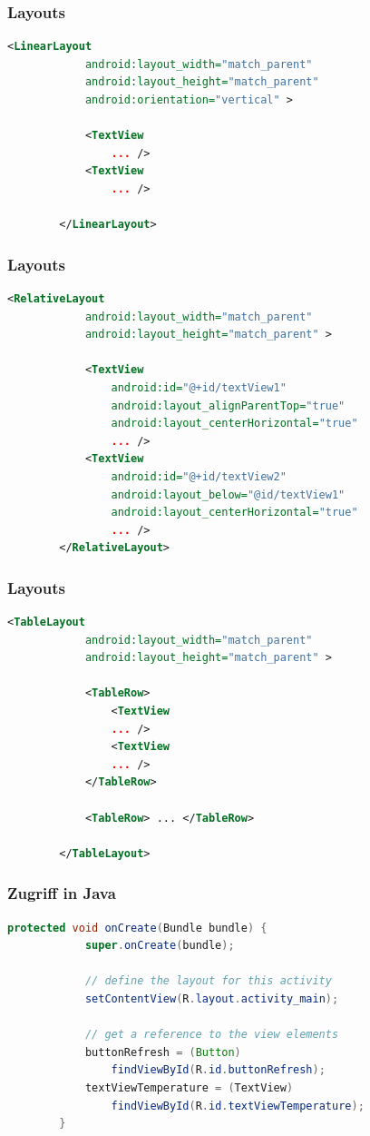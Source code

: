 \begin{frame}[fragile]
	\frametitle{Layouts}
	\vspace{-2mm}
	\begin{lstlisting}[language=XML]
		<LinearLayout
		    android:layout_width="match_parent"
		    android:layout_height="match_parent"
		    android:orientation="vertical" >

		    <TextView
		        ... />
		    <TextView
		        ... />

		</LinearLayout>
    \end{lstlisting}
\end{frame}

\begin{frame}[fragile]
	\frametitle{Layouts}
	\vspace{-2mm}
	\begin{lstlisting}[language=XML]
		<RelativeLayout
		    android:layout_width="match_parent"
		    android:layout_height="match_parent" >

		    <TextView
		        android:id="@+id/textView1"
		        android:layout_alignParentTop="true"
		        android:layout_centerHorizontal="true"
		        ... />
		    <TextView
		        android:id="@+id/textView2"
		        android:layout_below="@id/textView1"
		        android:layout_centerHorizontal="true"
		        ... />
		</RelativeLayout>
    \end{lstlisting}
\end{frame}

\begin{frame}[fragile]
	\frametitle{Layouts}
	\vspace{-2mm}
	\begin{lstlisting}[language=XML]
		<TableLayout
		    android:layout_width="match_parent"
		    android:layout_height="match_parent" >

		    <TableRow>
		        <TextView
		        ... />
		        <TextView
		        ... />
		    </TableRow>

		    <TableRow> ... </TableRow>

		</TableLayout>
    \end{lstlisting}
\end{frame}

\begin{frame}[fragile]
	\frametitle{Zugriff in Java}
	\begin{lstlisting}[language=Java]
		protected void onCreate(Bundle bundle) {
		    super.onCreate(bundle);

		    // define the layout for this activity
		    setContentView(R.layout.activity_main);
		    
		    // get a reference to the view elements
		    buttonRefresh = (Button)
		        findViewById(R.id.buttonRefresh);
		    textViewTemperature = (TextView)
		        findViewById(R.id.textViewTemperature);
		}
    \end{lstlisting}
\end{frame}

